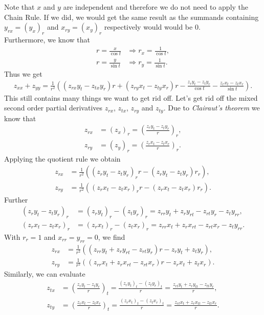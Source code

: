 \documentclass{article}
\begin{document}
Note that $x$ and $y$ are independent and therefore we do not need to apply the
Chain Rule. If we did, we would get the same result as the summands containing
$y_{rx}=(y_x)_r$ and $x_{ry}=(x_y)_r$ respectively would would be $0$.\\
Furthermore, we know that
\begin{align*}
  r = \frac{x}{\cos t} &\Rightarrow r_x = \frac{1}{\cos t},\\
  r = \frac{y}{\sin t} &\Rightarrow r_y = \frac{1}{\sin t}.
\end{align*}
Thus we get
\begin{align}
  \label{eq2}
  z_{xx} + z_{yy} = \frac{1}{r^2}\left(
    (z_{rx}y_t - z_{tx}y_r)r + (z_{ry}x_t-z_{ty}x_r)r
    -\frac{z_r y_t -z_t y_r}{\cos t} - \frac{z_r x_t - z_t x_r}{\sin t}
  \right).
\end{align}
This still contains many things we want to get rid off. Let's get rid off 
the mixed second order partial derivatives $z_{rx}$, $z_{tx}$, $z_{ry}$ and $z_{ty}$. 
Due to \emph{Clairaut's theorem} we know that
\begin{align*}
  z_{rx} &= (z_x)_r = \left(\frac{z_r y_t - z_t y_r}{r}\right)_r,\\
  z_{ry} &= (z_y)_r = \left(\frac{z_r x_t - z_t x_r}{r}\right)_r.
\end{align*}
Applying the quotient rule we obtain
\begin{align*}
  z_{rx} &= \frac{1}{r^2}\left((z_r y_t - z_t y_r)_r r - (z_r y_t - z_t y_r)r_r\right),\\
  z_{ry} &= \frac{1}{r^2}\left((z_r x_t - z_t x_r)_r r - (z_r x_t - z_t x_r)r_r\right).
\end{align*}
Further
\begin{align*}
  (z_r y_t - z_t y_r)_r 
  &= (z_r y_t)_r - (z_t y_r)_r
  = z_{rr}y_t + z_r y_{rt} - z_{rt} y_r - z_t y_{rr},\\ 
  (z_r x_t - z_t x_r)_r
  &= (z_r x_t)_r - (z_t x_r)_r
  = z_{rr} x_t + z_r x_{rt} - z_{rt} x_r - z_t y_{rr}.
\end{align*}
With $r_r=1$ and $x_{rr}=y_{rr}=0$, we find
\begin{align*}
  z_{rx} &= \frac{1}{r^2}\left((z_{rr}y_t + z_r y_{rt} - z_{rt} y_r) r - z_r y_t + z_t y_r\right),\\
  z_{ry} &= \frac{1}{r^2}\left((z_{rr} x_t + z_r x_{rt} - z_{rt} x_r) r - z_r x_t + z_t x_r\right).
\end{align*}
Similarly, we can evaluate
\begin{align}
  \label{eqztx}
  z_{tx} &= \left(\frac{z_r y_t - z_t y_r}{r}\right)_t 
  = \frac{(z_r y_t)_t - (z_t y_r)_t}{r}
  = \frac{z_{rt}y_t + z_ry_{tt} - z_{tt}y_{r}}{r},\\
  \label{eqzty}
  z_{ty} &= \left(\frac{z_r x_t - z_t x_r}{r}\right)_t
  = \frac{(z_r x_t)_t - (z_t x_r)_t}{r}
  = \frac{z_{rt}x_t + z_r x_{tt} - z_{tt}x_r}{r}.
\end{align}
\end{document}

